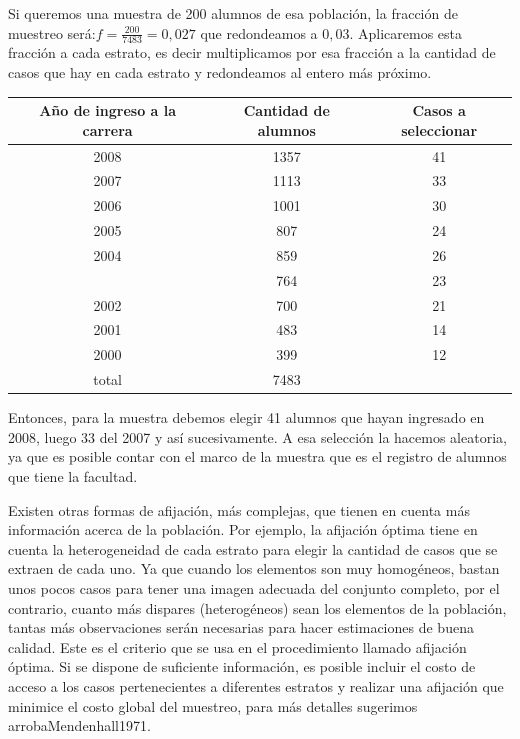\documentclass[]{book}
\begin{document}
Si queremos una muestra de 200 alumnos de esa población, la fracción de
muestreo será:\(f = \frac{200}{7483} = 0,027\) que redondeamos a \(0,03\).
Aplicaremos esta fracción a cada estrato, es decir multiplicamos por esa
fracción a la cantidad de casos que hay en cada estrato y redondeamos al
entero más próximo.

\begin{table}[H]
\centering
\begin{tabular}{ccc}
\toprule
Año de ingreso a la carrera & Cantidad de alumnos & Casos a seleccionar\\
\midrule
\rowcolor{gray!6}  2008 & 1357 & 41\\
2007 & 1113 & 33\\
\rowcolor{gray!6}  2006 & 1001 & 30\\
2005 & 807 & 24\\
\rowcolor{gray!6}  2004 & 859 & 26\\
\addlinespace
2003 & 764 & 23\\
\rowcolor{gray!6}  2002 & 700 & 21\\
2001 & 483 & 14\\
\rowcolor{gray!6}  2000 & 399 & 12\\
total & 7483 & \\
\bottomrule
\end{tabular}
\end{table}

Entonces, para la muestra debemos elegir 41 alumnos que hayan ingresado
en 2008, luego 33 del 2007 y así sucesivamente. A esa selección la
hacemos aleatoria, ya que es posible contar con el marco de la muestra
que es el registro de alumnos que tiene la facultad.

Existen otras formas de afijación, más complejas, que tienen en cuenta
más información acerca de la población. Por ejemplo, la afijación óptima
tiene en cuenta la heterogeneidad de cada estrato para elegir la
cantidad de casos que se extraen de cada uno. Ya que cuando los
elementos son muy homogéneos, bastan unos pocos casos para tener una
imagen adecuada del conjunto completo, por el contrario, cuanto más
dispares (heterogéneos) sean los elementos de la población, tantas más
observaciones serán necesarias para hacer estimaciones de buena calidad.
Este es el criterio que se usa en el procedimiento llamado afijación
óptima. Si se dispone de suficiente información, es posible incluir el
costo de acceso a los casos pertenecientes a diferentes estratos y
realizar una afijación que minimice el costo global del muestreo, para
más detalles sugerimos arrobaMendenhall1971.
\end{document}
